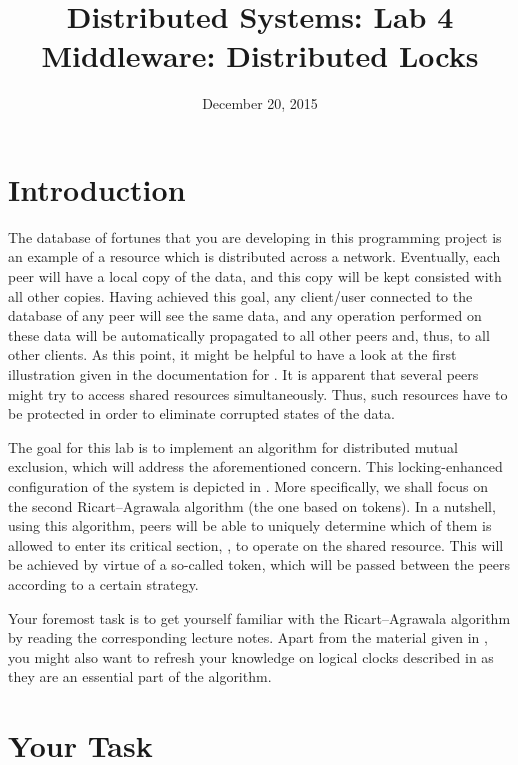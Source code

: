 \documentclass[a4paper]{article}
\title{Distributed Systems: Lab 4\\Middleware: Distributed Locks}
\author{}
\date{December 20, 2015}
\begin{document}
\maketitle

\section{Introduction}

The database of fortunes that you are developing in this programming project is
an example of a resource which is distributed across a network. Eventually, each
peer will have a local copy of the data, and this copy will be kept consisted
with all other copies. Having achieved this goal, any client/user connected to
the database of any peer will see the same data, and any operation performed on
these data will be automatically propagated to all other peers and, thus, to all
other clients. As this point, it might be helpful to have a look at the first
illustration given in the documentation for . It is apparent that
several peers might try to access shared resources simultaneously. Thus, such
resources have to be protected in order to eliminate corrupted states of the
data.

The goal for this lab is to implement an algorithm for distributed mutual
exclusion, which will address the aforementioned concern. This locking-enhanced
configuration of the system is depicted in . More specifically, we
shall focus on the second Ricart--Agrawala algorithm \cite{lecture67} (the one
based on tokens). In a nutshell, using this algorithm, peers will be able to
uniquely determine which of them is allowed to enter its critical section, \ie,
to operate on the shared resource. This will be achieved by virtue of a
so-called token, which will be passed between the peers according to a certain
strategy.

Your foremost task is to get yourself familiar with the Ricart--Agrawala
algorithm by reading the corresponding lecture notes. Apart from the material
given in \cite{lecture67}, you might also want to refresh your knowledge on
logical clocks described in \cite{lecture5} as they are an essential part of the
algorithm.

\section{Your Task}
\end{document}
